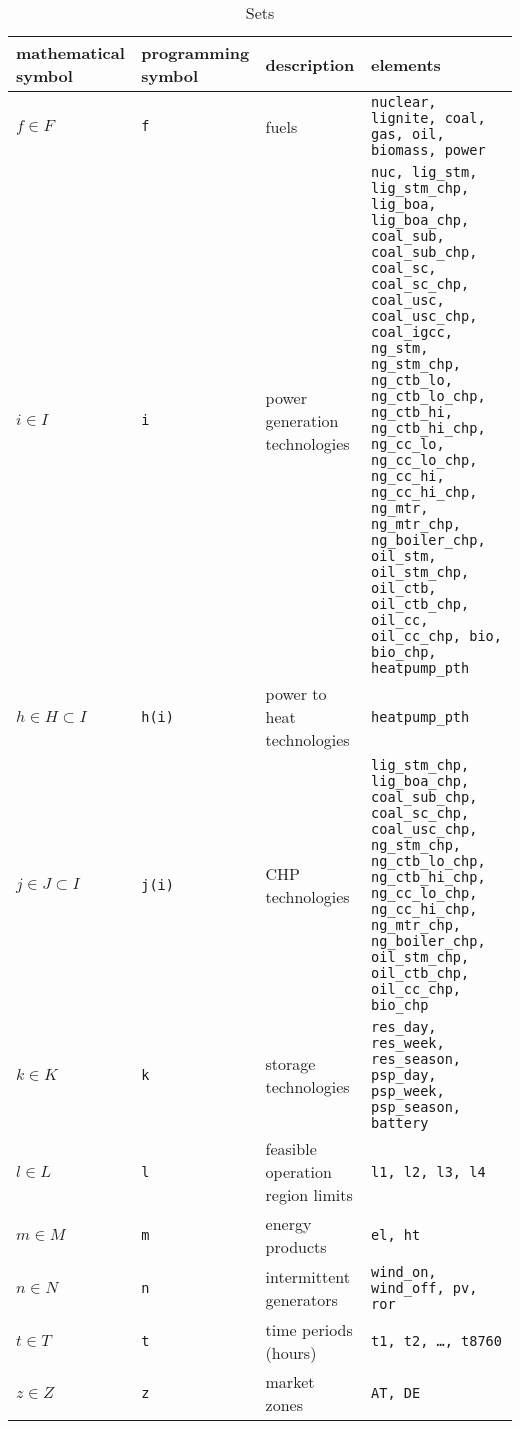 \documentclass[final, 3p, times]{elsarticle} %
\begin{document}
    \begin{table}
        \caption{Sets}
        \begin{tabulary}{\textwidth}{LLLp{6cm}}
            \toprule
            mathematical symbol & programming symbol & description & elements                                                      \\
            \midrule
            $f \in F$             & \texttt{f}         & fuels & \texttt{nuclear, lignite, coal, gas, oil, biomass, power}     \\
            $i \in I$             & \texttt{i}         & power generation technologies & \texttt{nuc, lig\_stm, lig\_stm\_chp, lig\_boa, lig\_boa\_chp,
            coal\_sub, coal\_sub\_chp, coal\_sc, coal\_sc\_chp, coal\_usc,
            coal\_usc\_chp, coal\_igcc, ng\_stm, ng\_stm\_chp, ng\_ctb\_lo,
            ng\_ctb\_lo\_chp, ng\_ctb\_hi, ng\_ctb\_hi\_chp, ng\_cc\_lo,
            ng\_cc\_lo\_chp, ng\_cc\_hi, ng\_cc\_hi\_chp, ng\_mtr,
            ng\_mtr\_chp, ng\_boiler\_chp, oil\_stm, oil\_stm\_chp,
            oil\_ctb, oil\_ctb\_chp, oil\_cc, oil\_cc\_chp, bio,
            bio\_chp, heatpump\_pth}                                        \\
            $h \in H \subset I$     & \texttt{h(i)}    & power to heat technologies & \texttt{heatpump\_pth}                                        \\
            $j \in J \subset I$     & \texttt{j(i)}    & CHP technologies & \texttt{lig\_stm\_chp, lig\_boa\_chp, coal\_sub\_chp,
            coal\_sc\_chp, coal\_usc\_chp, ng\_stm\_chp, ng\_ctb\_lo\_chp,
            ng\_ctb\_hi\_chp, ng\_cc\_lo\_chp, ng\_cc\_hi\_chp,
            ng\_mtr\_chp, ng\_boiler\_chp,
            oil\_stm\_chp, oil\_ctb\_chp, oil\_cc\_chp, bio\_chp}           \\
            $k \in K$               & \texttt{k}       & storage technologies & \texttt{res\_day, res\_week, res\_season, psp\_day,
            psp\_week, psp\_season, battery}                                \\
            $l \in L$               & \texttt{l}       & feasible operation region limits & \texttt{l1, l2, l3, l4}                                       \\
            $m \in M$               & \texttt{m}       & energy products & \texttt{el, ht}                                               \\
            $n \in N$               & \texttt{n}       & intermittent generators & \texttt{wind\_on, wind\_off, pv, ror}                         \\
            $t \in T$               & \texttt{t}       & time periods (hours)               & \texttt{t1, t2, \ldots, t8760}                                \\
            $z \in Z$               & \texttt{z}       & market zones & \texttt{AT, DE}                                               \\
            \bottomrule
        \end{tabulary}
    \end{table}
\end{document}
